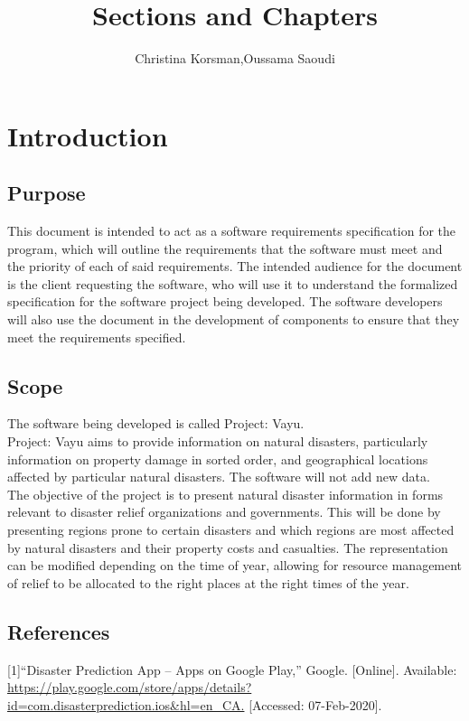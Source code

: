 \documentclass{article}
\title{Sections and Chapters}
\author{Christina Korsman,Oussama Saoudi}
\date{ }
\begin{document}
  
\maketitle
  
\tableofcontents

\section{Introduction}
\subsection{Purpose}
This document is intended to act as a software requirements 
specification for the program, which will outline the 
requirements that the software must meet and the priority 
of each of said requirements. The intended audience for the document 
is the client requesting the software, who will use it to understand 
the formalized specification for the software project being developed. 
The software developers will also use the document in the development 
of components to ensure that they meet the requirements specified.

\subsection{Scope}
The software being developed is called Project: Vayu.\\
 
 Project: Vayu aims to provide information on natural disasters, 
 particularly information on property damage in sorted order, 
 and geographical locations affected by particular natural disasters. 
 The software will not add new data.\\
  
The objective of the project is to present natural disaster information in forms relevant to
disaster relief organizations and governments. 
This will be done by presenting regions prone to
certain disasters and which regions are most affected by natural 
disasters and their property costs and casualties. The representation can 
be modified depending on the time of year, allowing for resource management of 
relief to be allocated to the right places at the right times of the year.

\subsection{References}
[1]“Disaster Prediction App – Apps on Google Play,” Google. [Online].
Available:  \url{ https://play.google.com/store/apps/details?id=com.disasterprediction.ios&hl=en_CA.}
[Accessed: 07-Feb-2020]. \\
\end{document}
